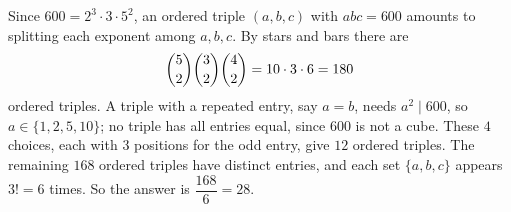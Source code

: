 Since $600=2^3\cdot3\cdot5^2$, an ordered triple $(a,b,c)$ with $abc=600$ amounts to splitting each exponent among $a,b,c$. By stars and bars there are
\[\dbinom52\dbinom32\dbinom42=10\cdot3\cdot6=180\]
ordered triples. A triple with a repeated entry, say $a=b$, needs $a^2\mid600$, so $a\in\{1,2,5,10\}$; no triple has all entries equal, since $600$ is not a cube. These $4$ choices, each with $3$ positions for the odd entry, give $12$ ordered triples. The remaining $168$ ordered triples have distinct entries, and each set $\{a,b,c\}$ appears $3!=6$ times. So the answer is $\dfrac{168}{6}=\boxed{28}$.
